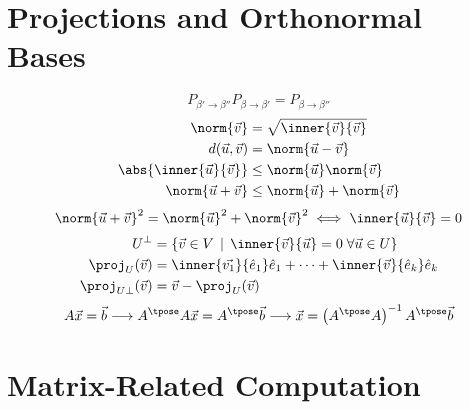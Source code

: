 \documentclass[10pt, a4paper]{article}
\begin{document}
\begin{landscape}
\begin{multicols}{3}
    \section{Projections and Orthonormal Bases}

    \[P_{\beta' \to \beta''} P_{\beta \to \beta'} = P_{\beta \to \beta''}\]
    \begin{align*}
        \norm{\vec{v}} &= \sqrt{\inner{\vec{v}}{\vec{v}}} \\
        d(\vec{u}, \vec{v}) &= \norm{\vec{u} - \vec{v}} \\
        \abs{\inner{\vec{u}}{\vec{v}}} &\leq \norm{\vec{u}} \norm{\vec{v}} \\
        \norm{\vec{u} + \vec{v}} &\leq \norm{\vec{u}} + \norm{\vec{v}}
    \end{align*}
    \[
        \norm{\vec{u} + \vec{v}}^{2} = \norm{\vec{u}}^{2} + \norm{\vec{v}}^{2} \iff \inner{\vec{u}}{\vec{v}} = 0
    \]
    \begin{align*}
        U^{\perp} &= \left\{ \vec{v} \in V \,\mid\, \inner{\vec{v}}{\vec{u}} = 0 \;\forall \vec{u} \in U \right\} \\
        \proj_{U} (\vec{v}) &= \inner{\vec{v_1}}{\hat e_{1}} \hat e_{1} + \cdots + \inner{\vec{v}}{\hat e_{k}} \hat e_{k} \\
    \proj_{U \perp} (\vec{v}) &= \vec{v} - \proj_{U} (\vec{v})
    \end{align*}
    \[A\vec{x} = \vec{b} \longrightarrow A^{\tpose} A \vec{x} = A^{\tpose} \vec{b}
    \longrightarrow \vec{x} = \left(A^{\tpose} A\right)^{-1} A^{\tpose} \vec{b}\]

    \section{Matrix-Related Computation}


\end{multicols}
\end{landscape}
\end{document}
